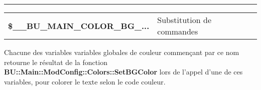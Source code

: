 \documentclass[a4paper,10pt]{article}
\begin{document}

\par\noindent\rule{\textwidth}{0.4pt}

\begin{justify}
    \begin{tabular}{l|l}
        \textbf{\color{vars}\$\_\_BU\_MAIN\_COLOR\_BG\_...} & Substitution de commandes\\
    \end{tabular}
\end{justify}

\begin{justify}
    Chacune des variables variables globales de couleur commençant par ce nom retourne le résultat de la fonction \textbf{\color{func}BU::Main::ModConfig::Colors::SetBGColor} lors de l'appel d'une de ces variables, pour colorer le texte selon le code couleur.
\end{justify}
\end{document}
